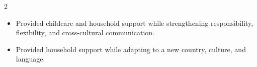 \documentclass[10pt,a4paper,ragged2e,withhyper]{altacv}
\begin{document}
\begin{paracol}{2}
\begin{rightcolumn}
\begin{itemize}
    \item Provided childcare and household support while strengthening responsibility, flexibility, and cross-cultural communication.
\end{itemize}

\divider

\begin{itemize}
    \item Provided household support while adapting to a new country, culture, and language.
\end{itemize}

\end{rightcolumn}
\end{paracol}
\end{document}
